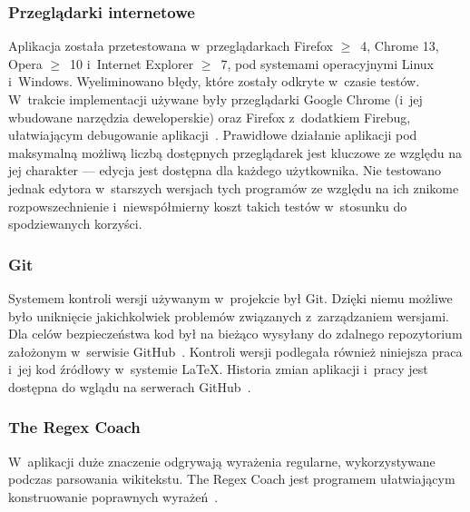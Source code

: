 \subsubsection{Przeglądarki internetowe}
Aplikacja została przetestowana w~przeglądarkach Firefox $\geq$~4, Chrome 13, Opera $\geq$~10 i~Internet Explorer $\geq$~7, pod systemami operacyjnymi Linux i~Windows. Wyeliminowano błędy, które zostały odkryte w~czasie testów. W~trakcie implementacji używane były przeglądarki Google Chrome (i~jej wbudowane narzędzia deweloperskie) oraz Firefox z~dodatkiem Firebug, ułatwiającym debugowanie aplikacji~\cite{firebug}. Prawidłowe działanie aplikacji pod maksymalną możliwą liczbą dostępnych przeglądarek jest kluczowe ze względu na jej charakter --- edycja jest dostępna dla każdego użytkownika. Nie testowano jednak edytora w~starszych wersjach tych programów ze względu na ich znikome rozpowszechnienie i~niewspółmierny koszt takich testów w~stosunku do spodziewanych korzyści.
\subsubsection{Git}
Systemem kontroli wersji używanym w~projekcie był Git. Dzięki niemu możliwe było uniknięcie jakichkolwiek problemów związanych z~zarządzaniem wersjami. Dla celów bezpieczeństwa kod był na bieżąco wysyłany do zdalnego repozytorium założonym w~serwisie GitHub~\cite{github}. Kontroli wersji podlegała również niniejsza praca i~jej kod źródłowy w~systemie \LaTeX. Historia zmian aplikacji i~pracy jest dostępna do wglądu na serwerach GitHub~\cite{github:wikt}.
\subsubsection{The Regex Coach}
W~aplikacji duże znaczenie odgrywają wyrażenia regularne, wykorzystywane podczas parsowania wikitekstu. The Regex Coach jest programem ułatwiającym konstruowanie poprawnych wyrażeń~\cite{regexcoach}.
\spacer


